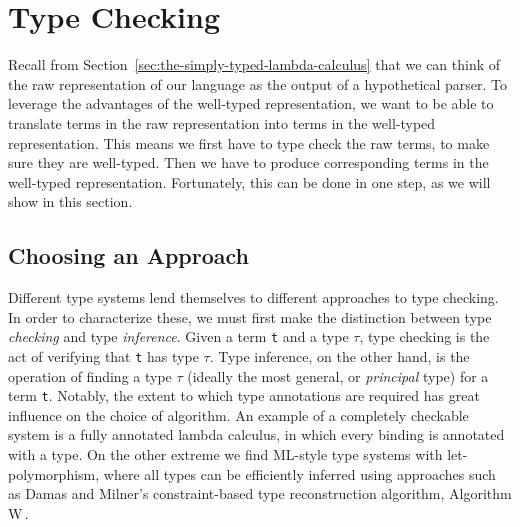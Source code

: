 \section{Type Checking}
\label{sec:type-checking}




Recall from Section~\ref{sec:the-simply-typed-lambda-calculus} that we can think of the raw representation of our language as the output of a hypothetical parser. To leverage the advantages of the well-typed representation, we want to be able to translate terms in the raw representation into terms in the well-typed representation. This means we first have to type check the raw terms, to make sure they are well-typed. Then we have to produce corresponding terms in the well-typed representation. Fortunately, this can be done in one step, as we will show in this section.

\subsection{Choosing an Approach}
Different type systems lend themselves to different approaches to type checking. In order to characterize these, we must first make the distinction between type \emph{checking} and type \emph{inference}. Given a term \texttt{t} and a type $\tau$, type checking is the act of verifying that \texttt{t} has type $\tau$. Type inference, on the other hand, is the operation of finding a type $\tau$ (ideally the most general, or \emph{principal} type) for a term \texttt{t}. Notably, the extent to which type annotations are required has great influence on the choice of algorithm. An example of a completely checkable system is a fully annotated lambda calculus, in which every binding is annotated with a type. On the other extreme we find ML-style type systems with let-polymorphism, where all types can be efficiently inferred using approaches such as Damas and Milner's constraint-based type reconstruction algorithm, Algorithm W\,\cite{Damas:1982}. 

